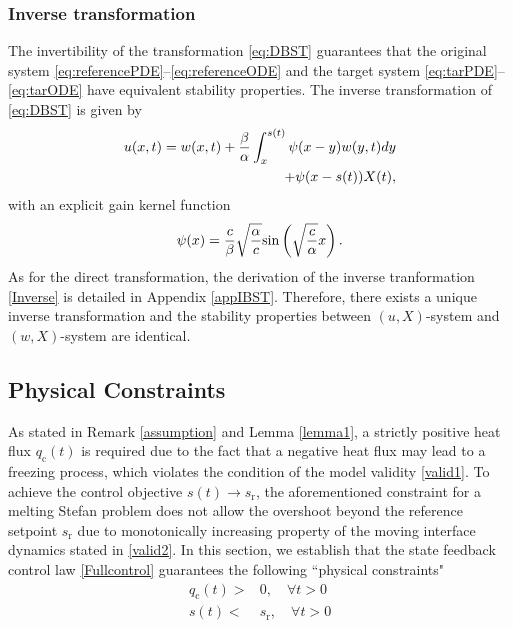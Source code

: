 \documentclass[journal]{IEEEtran}
\begin{document}
\subsubsection{Inverse transformation}
The invertibility of the transformation \eqref{eq:DBST}  guarantees that  the original system \eqref{eq:referencePDE}--\eqref{eq:referenceODE} and the target system \eqref{eq:tarPDE}--\eqref{eq:tarODE} have equivalent stability properties. The inverse transformation of \eqref{eq:DBST} is given by 
\begin{align}\label{Inverse}
u(x,t) = w(x,t) +\frac{\beta}{\alpha} \int_x^{s(t)} \psi(x-y)w(y,t) dy\notag\\
+\psi(x-s(t))X(t),
\end{align}
with an explicit gain kernel function
\begin{align}\label{invback}
\psi(x) = \frac{c}{\beta} \sqrt{\frac{\alpha}{c}} {\rm sin} \left(\sqrt{\frac{c}{\alpha}} x \right). 
\end{align}
As for the direct transformation, the derivation of the inverse tranformation \eqref{Inverse} is  detailed in Appendix \ref{appIBST}. Therefore, there exists a unique inverse transformation and  the stability properties between $(u,X)$-system and $(w,X)$-system are identical. 
\subsection{Physical Constraints}\label{positivness}
As stated in Remark \ref{assumption} and Lemma \ref{lemma1}, a strictly positive heat flux  $q_{{\mathrm c}}(t)$ is required due to the fact that a negative heat flux may lead to a freezing process, which violates the condition of the model validity \eqref{valid1}. To achieve the control objective $s(t) \to s_{{\mathrm r}}$, the aforementioned constraint for a melting Stefan problem does not allow the overshoot beyond the reference setpoint  $s_{{\mathrm r}}$ due to monotonically increasing property of the moving interface dynamics stated in \eqref{valid2}. In this section, we establish that the state feedback control law \eqref{Fullcontrol} guarantees the following ``physical constraints" 
\begin{align}\label{physical constraints}
q_{{\mathrm c}}(t)>&0, \quad  \forall t>0 \\  
\label{constraint2}s(t)<&s_{{\mathrm r}}, \quad  \forall t>0
\end{align}
\end{document}
